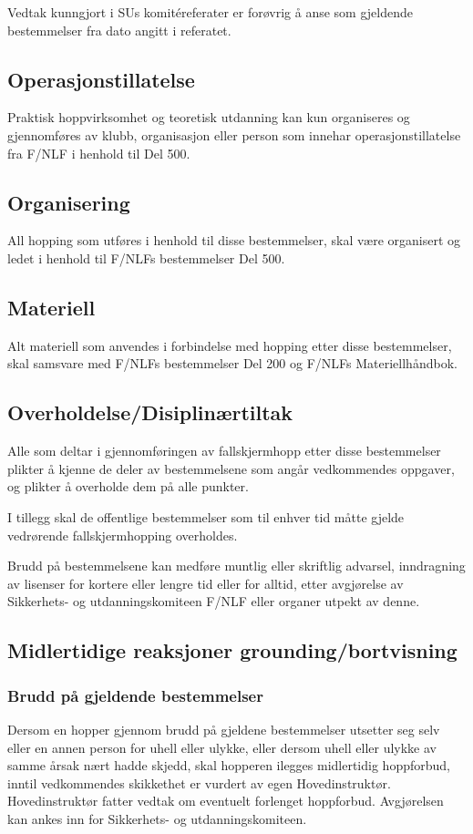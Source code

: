 Vedtak kunngjort i SUs komitéreferater er forøvrig å anse som gjeldende bestemmelser fra dato angitt i referatet.

\subsection{Operasjonstillatelse}
Praktisk hoppvirksomhet og teoretisk utdanning kan kun organiseres og gjennomføres av klubb, organisasjon eller person som innehar operasjonstillatelse fra F/NLF i henhold til Del 500.

\subsection{Organisering}
All hopping som utføres i henhold til disse bestemmelser, skal være organisert og ledet i henhold til F/NLFs bestemmelser Del 500.

\subsection{Materiell}
Alt materiell som anvendes i forbindelse med hopping etter disse bestemmelser, skal samsvare med F/NLFs bestemmelser Del 200 og F/NLFs Materiellhåndbok.

\subsection{Overholdelse/Disiplinærtiltak}
Alle som deltar i gjennomføringen av fallskjermhopp etter disse bestemmelser plikter å kjenne de deler av bestemmelsene som angår vedkommendes oppgaver, og plikter å overholde dem på alle punkter.

I tillegg skal de offentlige bestemmelser som til enhver tid måtte gjelde vedrørende fallskjermhopping overholdes.

Brudd på bestemmelsene kan medføre muntlig eller skriftlig advarsel, inndragning av lisenser for kortere eller lengre tid eller for alltid, etter avgjørelse av Sikkerhets- og utdanningskomiteen F/NLF eller organer utpekt av denne.

\subsection{Midlertidige reaksjoner grounding/bortvisning}
\subsubsection{Brudd på gjeldende bestemmelser}
Dersom en hopper gjennom brudd på gjeldene bestemmelser utsetter seg selv eller en annen person for uhell eller ulykke, eller dersom uhell eller ulykke av samme årsak nært hadde skjedd, skal hopperen ilegges midlertidig hoppforbud, inntil vedkommendes skikkethet er vurdert av egen Hovedinstruktør. Hovedinstruktør fatter vedtak om eventuelt forlenget hoppforbud. Avgjørelsen kan ankes inn for Sikkerhets- og utdanningskomiteen.

